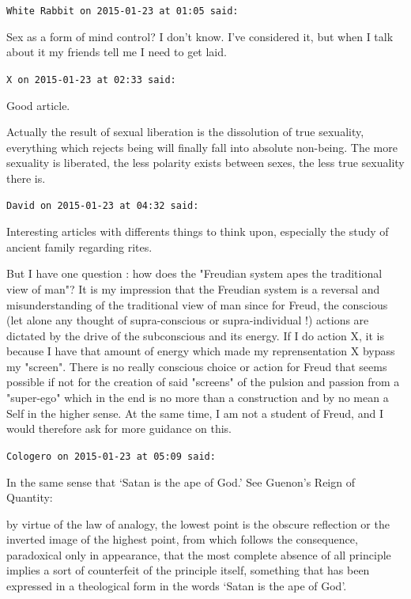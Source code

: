 \begin{footnotesize}\begin{sffamily}



\texttt{White Rabbit on 2015-01-23 at 01:05 said: }

Sex as a form of mind control? I don't know. I've considered it, but when I talk about it my friends tell me I need to get laid.


\hfill

\texttt{X on 2015-01-23 at 02:33 said: }

Good article.

Actually the result of sexual liberation is the dissolution of true sexuality, everything which rejects being will finally fall into absolute non-being. The more sexuality is liberated, the less polarity exists between sexes, the less true sexuality there is.


\hfill

\texttt{David on 2015-01-23 at 04:32 said: }

Interesting articles with differents things to think upon, especially the study of ancient family regarding rites. 

But I have one question : how does the "Freudian system apes the traditional view of man"? It is my impression that the Freudian system is a reversal and misunderstanding of the traditional view of man since for Freud, the conscious (let alone any thought of supra-conscious or supra-individual !) actions are dictated by the drive of the subconscious and its energy. If I do action X, it is because I have that amount of energy which made my reprensentation X bypass my "screen". There is no really conscious choice or action for Freud that seems possible if not for the creation of said "screens" of the pulsion and passion from a "super-ego" which in the end is no more than a construction and by no mean a Self in the higher sense. At the same time, I am not a student of Freud, and I would therefore ask for more guidance on this.


\hfill

\texttt{Cologero on 2015-01-23 at 05:09 said: }

In the same sense that `Satan is the ape of God.' See Guenon's Reign of Quantity:

\begin{quotex}
by virtue of the law of analogy, the lowest point is the obscure reflection or the inverted image of the highest point, from which follows the consequence, paradoxical only in appearance, that the most complete absence of all principle implies a sort of counterfeit of the principle itself, something that has been expressed in a theological form in the words `Satan is the ape of God'.


\end{quotex}
\end{sffamily}
\end{footnotesize}
